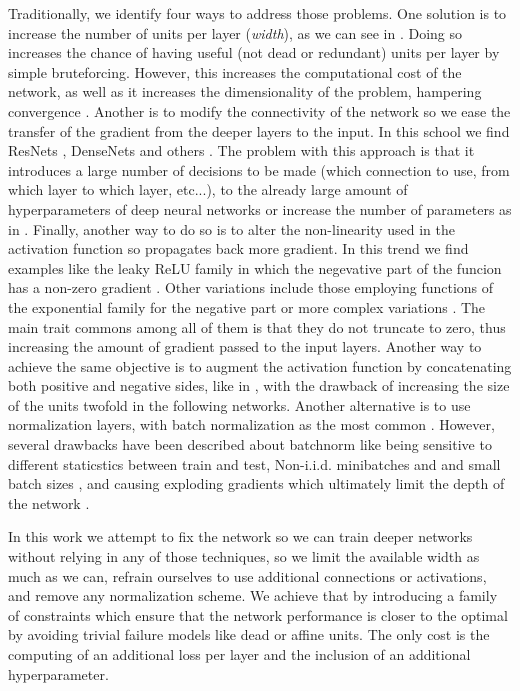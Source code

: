Traditionally, we identify four ways to address those problems. One solution is to increase the number of units per layer (\emph{width}), as we can see in \cite{wideresnet,inceptionv1}. Doing so increases the chance of having useful (not dead or redundant) units per layer by simple bruteforcing. However, this increases the computational cost of the network, as well as it increases the dimensionality of the problem, hampering convergence \cite{cursedim}.  Another is to modify the connectivity of the network so we ease the transfer of the gradient from the deeper layers to the input. In this school we find ResNets \cite{resnet}, DenseNets \cite{densenet} and others \cite{ladder,nin,highway}. The problem with this approach is that it introduces a large number of decisions to be made (which connection to use, from which layer to which layer, etc...), to the already large amount of hyperparameters of deep neural networks or increase the number of parameters as in \cite{densenet}. Finally, another way to do so is to alter the non-linearity used in the activation function so propagates back more gradient. In this trend we find examples like the leaky ReLU family in which the negevative part of the funcion has a non-zero gradient \cite{leaky,prelu}. Other variations include those employing functions of the exponential family for the negative part \cite{selu,elu} or more complex variations \cite{swish, srelu}. The main trait commons among all of them is that they do not truncate to zero, thus increasing the amount of gradient passed to the input layers. Another way to achieve the same objective is to augment the activation function by concatenating both positive and negative sides, like in \cite{crelu}, with the drawback of increasing the size of the units twofold in the following networks. Another alternative is to use normalization layers, with batch normalization as the most common \cite{batchnorm}. However, several drawbacks have been described about batchnorm like being sensitive to different staticstics between train and test, Non-i.i.d. minibatches and  and small batch sizes \cite{batchrenorm}, and causing exploding gradients which ultimately limit the depth of the network \cite{batchnormGradientExplosion}.

In this work we attempt to fix the network so we can train deeper networks without relying in any of those techniques, so we limit the available width as much as we can, refrain ourselves to use additional connections or activations, and remove any normalization scheme. We achieve that by introducing a family of constraints which ensure that the network performance is closer to the optimal by avoiding trivial failure models like dead or affine units. The only cost is the computing of an additional loss per layer and the inclusion of an additional hyperparameter. 